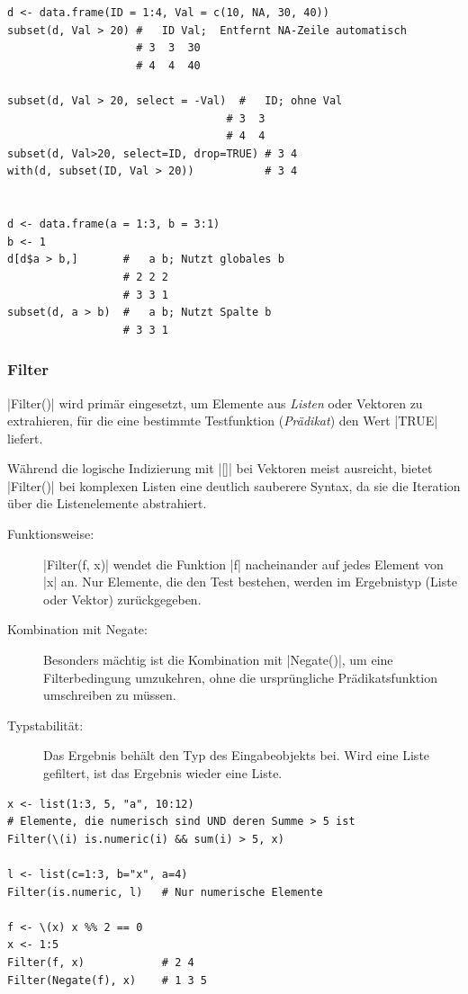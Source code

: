 \documentclass[10pt,twocolumn]{scrartcl}
\renewcommand{\lstinline}{\mycoloredinline}
\begin{document}
\begin{lstlisting}
d <- data.frame(ID = 1:4, Val = c(10, NA, 30, 40))
subset(d, Val > 20) #   ID Val;  Entfernt NA-Zeile automatisch
                    # 3  3  30
                    # 4  4  40

subset(d, Val > 20, select = -Val)  #   ID; ohne Val
                                  # 3  3
                                  # 4  4
subset(d, Val>20, select=ID, drop=TRUE) # 3 4
with(d, subset(ID, Val > 20))           # 3 4


d <- data.frame(a = 1:3, b = 3:1)
b <- 1
d[d$a > b,]       #   a b; Nutzt globales b
                  # 2 2 2
                  # 3 3 1
subset(d, a > b)  #   a b; Nutzt Spalte b
                  # 3 3 1
\end{lstlisting}


\subsubsection{Filter}

\lstinline|Filter()| wird primär eingesetzt, um Elemente aus \emph{Listen} oder Vektoren zu extrahieren, für die eine bestimmte Testfunktion (\emph{Prädikat}) den Wert \lstinline|TRUE| liefert. 

Während die logische Indizierung mit \lstinline|[]| bei Vektoren meist ausreicht, bietet \lstinline|Filter()| bei komplexen Listen eine deutlich sauberere Syntax, da sie die Iteration über die Listenelemente abstrahiert.

\begin{description}
\item[Funktionsweise:] \lstinline|Filter(f, x)| wendet die Funktion \lstinline|f| nacheinander auf jedes Element von \lstinline|x| an. Nur Elemente, die den Test bestehen, werden im Ergebnistyp (Liste oder Vektor) zurückgegeben.
\item[Kombination mit Negate:] Besonders mächtig ist die Kombination mit \lstinline|Negate()|, um eine Filterbedingung umzukehren, ohne die ursprüngliche Prädikatsfunktion umschreiben zu müssen.
\item[Typstabilität:] Das Ergebnis behält den Typ des Eingabeobjekts bei. Wird eine Liste gefiltert, ist das Ergebnis wieder eine Liste.
\end{description}

\begin{lstlisting}
x <- list(1:3, 5, "a", 10:12)
# Elemente, die numerisch sind UND deren Summe > 5 ist
Filter(\(i) is.numeric(i) && sum(i) > 5, x)

l <- list(c=1:3, b="x", a=4)
Filter(is.numeric, l)   # Nur numerische Elemente

f <- \(x) x %% 2 == 0
x <- 1:5
Filter(f, x)            # 2 4
Filter(Negate(f), x)    # 1 3 5
\end{lstlisting}
\end{document}
